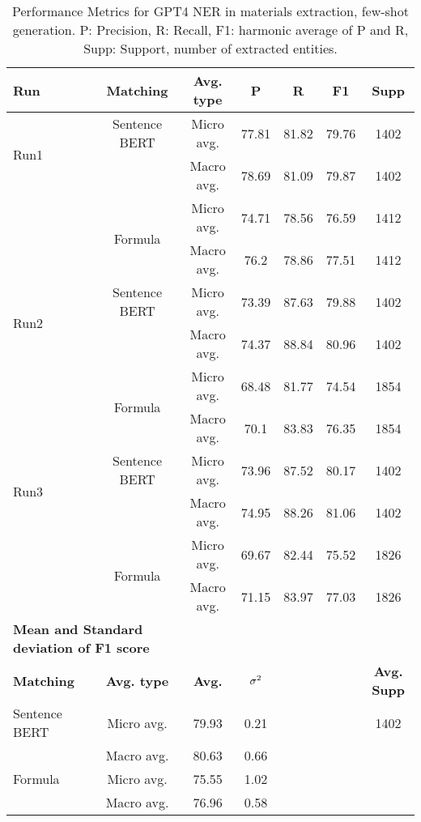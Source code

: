 \begin{table}[htbp]
\small
  \centering
  \caption{Performance Metrics for GPT4 NER in materials extraction, few-shot generation. P: Precision, R: Recall, F1: harmonic average of P and R, Supp: Support, number of extracted entities.}
  \begin{tabular}{lcccccc}
    \toprule
    \textbf{Run} & \textbf{Matching} & \textbf{Avg. type} & \textbf{P} & \textbf{R} & \textbf{F1} & \textbf{Supp} \\
    \midrule
    \multirow{2}{*}{Run1} & Sentence BERT & Micro avg. & 77.81 & 81.82 & 79.76 & 1402 \\
    & & Macro avg. & 78.69 & 81.09 & 79.87 & 1402 \\
    \cmidrule{2-7}
    & \multirow{2}{*}{Formula} & Micro avg. & 74.71 & 78.56 & 76.59 & 1412 \\
    & & Macro avg. & 76.2 & 78.86 & 77.51 & 1412 \\
    \midrule
    \multirow{2}{*}{Run2} & Sentence BERT & Micro avg. & 73.39 & 87.63 & 79.88 & 1402 \\
    & & Macro avg. & 74.37 & 88.84 & 80.96 & 1402 \\
    \cmidrule{2-7}
    & \multirow{2}{*}{Formula} & Micro avg. & 68.48 & 81.77 & 74.54 & 1854 \\
    & & Macro avg. & 70.1 & 83.83 & 76.35 & 1854 \\
    \midrule
    \multirow{2}{*}{Run3} & Sentence BERT & Micro avg. & 73.96 & 87.52 & 80.17 & 1402 \\
    & & Macro avg. & 74.95 & 88.26 & 81.06 & 1402 \\
    \cmidrule{2-7}
    & \multirow{2}{*}{Formula} & Micro avg. & 69.67 & 82.44 & 75.52 & 1826 \\
    & & Macro avg. & 71.15 & 83.97 & 77.03 & 1826 \\
    \midrule
    \multicolumn{2}{l}{\textbf{Mean and Standard deviation of F1 score}} & & & & & \\
    \midrule
    \textbf{Matching} & \textbf{Avg. type} & \textbf{Avg.} & $\sigma\textsuperscript{2}$ & & & \textbf{Avg. Supp}\\
    Sentence BERT & Micro avg. & 79.93 & 0.21 & & & 1402 \\
    & Macro avg. & 80.63 & 0.66 & & & \\
    Formula & Micro avg. & 75.55 & 1.02 & & & \\
    & Macro avg. & 76.96 & 0.58 & & & \\
    \bottomrule
  \end{tabular}
\end{table}


